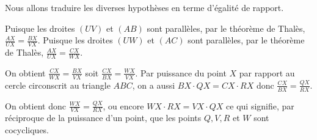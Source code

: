 \begin{sol}
\begin{center}
\end{center}

Nous allons traduire les diverses hypothèses en terme d'égalité de rapport. 

Puisque les droites $(UV)$ et $(AB)$ sont parallèles, par le théorème de Thalès, $\frac{AX}{UX}=\frac{BX}{VX}$.
Puisque les droites $(UW)$ et $(AC)$ sont parallèles, par le théorème de Thalès, $\frac{AX}{UX}=\frac{CX}{WX}$.

On obtient $\frac{CX}{WX}=\frac{BX}{VX}$ soit $\frac{CX}{BX}=\frac{WX}{VX}$. Par puissance du point $X$ par rapport au cercle circonscrit au triangle $ABC$, on a aussi $BX\cdot QX=CX\cdot RX$ donc $\frac{CX}{BX}=\frac{QX}{RX}$. 

On obtient donc $\frac{WX}{VX}=\frac{QX}{RX}$, ou encore $WX\cdot RX=VX\cdot QX$ ce qui signifie, par réciproque de la puissance d'un point, que les points $Q,V,R$ et $W$ sont cocycliques.  

\end{sol}
